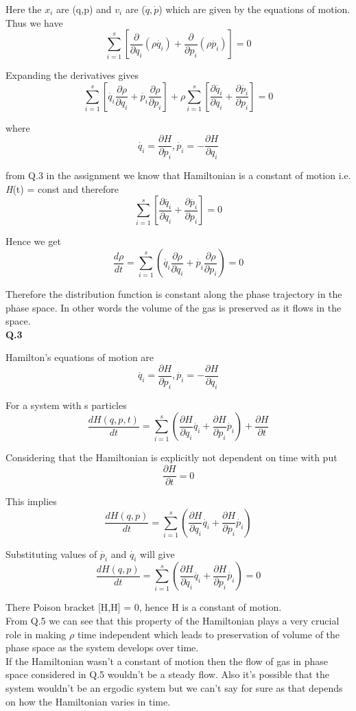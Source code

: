 \documentclass[12pt]{article}
\begin{document}
Here the $x_i$ are (q,p) and $v_i$ are ($\dot{q},\dot{p}$) which are given by the equations of motion. Thus we have $$ \displaystyle\sum_{i=1}^{s}\left[\frac{\partial}{\partial q_i} (\rho \dot{q_i}) + \frac{\partial}{\partial p_i}(\rho \dot{p_i}) \right] = 0 $$

Expanding the derivatives gives $$\displaystyle\sum_{i=1}^{s} \left [\dot{q_i}\frac{\partial \rho}{\partial q_i} + \dot{p_i} \frac{\partial \rho}{\partial p_i}\right] + \rho \displaystyle\sum_{i=1}^{s} \left[ \frac{\partial \dot{q_i}}{\partial q_i}	 + \frac{\partial \dot{p_i}}{\partial p_i} \right] = 0$$

where $$ \dot{q_i} = \frac{\partial H}{\partial p_i},    \dot{p_i} = -\frac{\partial H}{\partial q_i}  $$

from Q.3 in the assignment we know that Hamiltonian is a constant of motion i.e. \textit H(t) = const and therefore  $$ \displaystyle\sum_{i=1}^{s} \left[ \frac{\partial \dot{q_i}}{\partial q_i}	 + \frac{\partial \dot{p_i}}{\partial p_i} \right] = 0$$

Hence we get $$ \frac{d\rho}{dt} =  \displaystyle\sum_{i=1}^{s} \left (\dot{q_i}\frac{\partial \rho}{\partial q_i} + \dot{p_i} \frac{\partial \rho}{\partial p_i}\right) = 0 $$

Therefore the distribution function is constant along the phase trajectory in the phase space. In other words the volume of the gas is preserved as it flows in the space. \\

\textbf {Q.3}

Hamilton's equations of motion are $$ \dot{q_i} = \frac{\partial H}{\partial p_i},    \dot{p_i} = -\frac{\partial H}{\partial q_i}  $$


For a system with s particles 
$$ \frac{dH(q,p,t)}{dt} =  \displaystyle\sum_{i=1}^{s} \left (\frac{\partial H}{\partial q_i}\dot{q_i} +  \frac{\partial H}{\partial p_i}\dot{p_i}\right) + \frac{\partial H}{\partial t}$$

Considering that the Hamiltonian is explicitly not dependent on time with put $$\frac{\partial H}{\partial t} = 0 $$

This implies $$ \frac{dH(q,p)}{dt} =  \displaystyle\sum_{i=1}^{s} \left (\frac{\partial H}{\partial q_i}\dot{q_i} +  \frac{\partial H}{\partial p_i}\dot{p_i}\right) $$

Substituting values of $\dot{p_i}$ and $\dot{q_i}$ will give 
$$ \frac{dH(q,p)}{dt} =  \displaystyle\sum_{i=1}^{s} \left (\frac{\partial H}{\partial q_i}\dot{q_i} +  \frac{\partial H}{\partial p_i}\dot{p_i}\right)  = 0 $$

There Poison bracket [H,H] = 0, hence H is a constant of motion. \\ From Q.5 we can see that this property of the Hamiltonian plays a very crucial role in making $ \rho$ time independent which leads to preservation of volume of the phase space as the system develops over time. \\ If the Hamiltonian wasn't a constant of motion then the flow of gas in phase space considered in Q.5 wouldn't be a steady flow. Also it's possible that the system wouldn't be an ergodic system but we can't say for sure as that depends on how the Hamiltonian varies in time.
\end{document}
